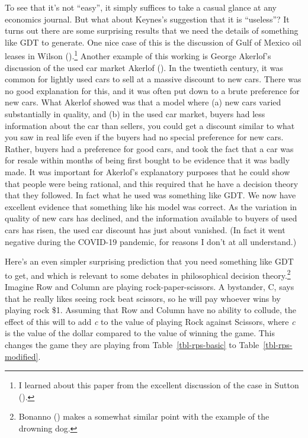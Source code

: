 \documentclass[
  12pt,
  letterpaper,
  DIV=11,
  numbers=noendperiod]{scrreprt}
\begin{document}
To see that it's not ``easy'', it simply suffices to take a casual
glance at any economics journal. But what about Keynes's suggestion that
it is ``useless''? It turns out there are some surprising results that
we need the details of something like GDT to generate. One nice case of
this is the discussion of Gulf of Mexico oil leases in Wilson
().\footnote{I learned about this paper
  from the excellent discussion of the case in Sutton
  ().} Another example of this working is
George Akerlof's discussion of the used car market Akerlof
(). In the twentieth century, it was
common for lightly used cars to sell at a massive discount to new cars.
There was no good explanation for this, and it was often put down to a
brute preference for new cars. What Akerlof showed was that a model
where (a) new cars varied substantially in quality, and (b) in the used
car market, buyers had less information about the car than sellers, you
could get a discount similar to what you saw in real life even if the
buyers had no special preference for new cars. Rather, buyers had a
preference for good cars, and took the fact that a car was for resale
within months of being first bought to be evidence that it was badly
made. It was important for Akerlof's explanatory purposes that he could
show that people were being rational, and this required that he have a
decision theory that they followed. In fact what he used was something
like GDT. We now have excellent evidence that something like his model
was correct. As the variation in quality of new cars has declined, and
the information available to buyers of used cars has risen, the used car
discount has just about vanished. (In fact it went negative during the
COVID-19 pandemic, for reasons I don't at all understand.)

Here's an even simpler surprising prediction that you need something
like GDT to get, and which is relevant to some debates in philosophical
decision theory.\footnote{Bonanno () makes a somewhat similar point with the example of the drowning
  dog.} Imagine Row and Column are playing rock-paper-scissors. A
bystander, C, says that he really likes seeing rock beat scissors, so he
will pay whoever wins by playing rock \$1. Assuming that Row and Column
have no ability to collude, the effect of this will to add \emph{c} to
the value of playing Rock against Scissors, where \emph{c} is the value
of the dollar compared to the value of winning the game. This changes
the game they are playing from Table~\ref{tbl-rps-basic} to
Table~\ref{tbl-rps-modified}.
\end{document}

